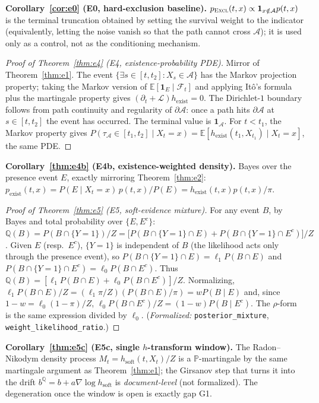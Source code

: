\documentclass[11pt]{article}
\newcommand{\Aregion}{\mathcal{A}}
\newcommand{\ind}{\mathbf{1}}
\newcommand{\E}[1]{\mathbb{E}\left[#1\right]}
\newcommand{\Excl}{\textsc{Excl}}
\newcommand{\lean}[1]{\texttt{#1}}
\begin{document}
\textbf{Corollary~\ref{cor:e0} (E0, hard-exclusion baseline).}
$p_{\Excl}(t,x)\propto\ind_{x\notin\Aregion}p(t,x)$ is the terminal truncation
obtained by setting the survival weight to the indicator (equivalently, letting the noise
vanish so that the path cannot cross $\Aregion$); it is used only as a control, not as the
conditioning mechanism.

\begin{proof}[Proof of Theorem~\ref{thm:e4} (E4, existence-probability PDE)]
Mirror of Theorem~\ref{thm:e1}. The event $\{\exists s\in[t,t_2]:X_s\in\Aregion\}$ has the
Markov projection property; taking the Markov version of $\E{\ind_E\mid\mathcal{F}_t}$ and
applying It\^o's formula plus the martingale property gives
$(\partial_t+\mathcal{L})h_{\mathrm{exist}}=0$. The Dirichlet-$1$ boundary follows from path
continuity and regularity of $\partial\Aregion$: once a path hits $\partial\Aregion$ at
$s\in[t,t_2]$ the event has occurred. The terminal value is $\ind_{\Aregion}$. For $t<t_1$,
the Markov property gives $P(\tau_{\Aregion}\in[t_1,t_2]\mid X_t=x)
=\E{h_{\mathrm{exist}}(t_1,X_{t_1})\mid X_t=x}$, the same PDE.
\end{proof}

\textbf{Corollary~\ref{thm:e4b} (E4b, existence-weighted density).}
Bayes over the presence event $E$, exactly mirroring Theorem~\ref{thm:e2}:
$p_{\mathrm{exist}}(t,x)=P(E\mid X_t=x)\,p(t,x)/P(E)=h_{\mathrm{exist}}(t,x)p(t,x)/\pi$.

\begin{proof}[Proof of Theorem~\ref{thm:e5} (E5, soft-evidence mixture)]
For any event $B$, by Bayes and total probability over $\{E,E^c\}$:
$\mathbb{Q}(B)=P(B\cap\{Y{=}1\})/Z=\big[P(B\cap\{Y{=}1\}\cap E)+P(B\cap\{Y{=}1\}\cap
E^c)\big]/Z$. Given $E$ (resp.\ $E^c$), $\{Y{=}1\}$ is independent of $B$ (the likelihood acts
only through the presence event), so $P(B\cap\{Y{=}1\}\cap E)=\ell_1P(B\cap E)$ and
$P(B\cap\{Y{=}1\}\cap E^c)=\ell_0P(B\cap E^c)$. Thus
$\mathbb{Q}(B)=[\ell_1P(B\cap E)+\ell_0P(B\cap E^c)]/Z$. Normalizing,
$\ell_1P(B\cap E)/Z=(\ell_1\pi/Z)(P(B\cap E)/\pi)=wP(B\mid E)$ and, since
$1-w=\ell_0(1-\pi)/Z$, $\ell_0P(B\cap E^c)/Z=(1-w)P(B\mid E^c)$. The
$\rho$-form is the same expression divided by $\ell_0$. (\emph{Formalized:}
\lean{posterior\_mixture}, \lean{weight\_likelihood\_ratio}.)
\end{proof}

\textbf{Corollary~\ref{thm:e5c} (E5c, single $h$-transform window).}
The Radon--Nikodym density process $M_t=h_{\mathrm{soft}}(t,X_t)/Z$ is a $\mathbb{P}$-martingale
by the same martingale argument as Theorem~\ref{thm:e1}; the Girsanov step that turns it into
the drift $b^{\mathbb Q}=b+a\nabla\log h_{\mathrm{soft}}$ is \emph{document-level} (not
formalized). The degeneration once the window is open is exactly gap G1.
\end{document}
